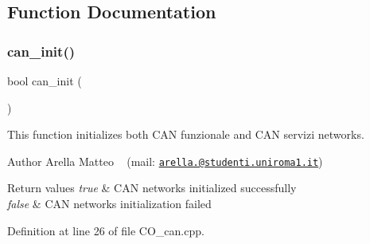 \subsection{Function Documentation}
\mbox{\label{group___c_a_n__module__group_ga36b6b5924eb84ef2e4c2bd548b28436f}} 
\subsubsection{\texorpdfstring{can\+\_\+init()}{can\_init()}}
{\footnotesize\ttfamily bool can\+\_\+init (\begin{DoxyParamCaption}{ }\end{DoxyParamCaption})}



This function initializes both C\+AN funzionale and C\+AN servizi networks. 

\begin{DoxyAuthor}{Author}
Arella Matteo ~\newline
 (mail\+: \href{mailto:arella.1646983@studenti.uniroma1.it}{\tt arella.@studenti.\+uniroma1.\+it}) 
\end{DoxyAuthor}

\begin{DoxyRetVals}{Return values}
{\em true} & C\+AN networks initialized successfully \\
\hline
{\em false} & C\+AN networks initialization failed \\
\hline
\end{DoxyRetVals}


Definition at line 26 of file C\+O\+\_\+can.\+cpp.

